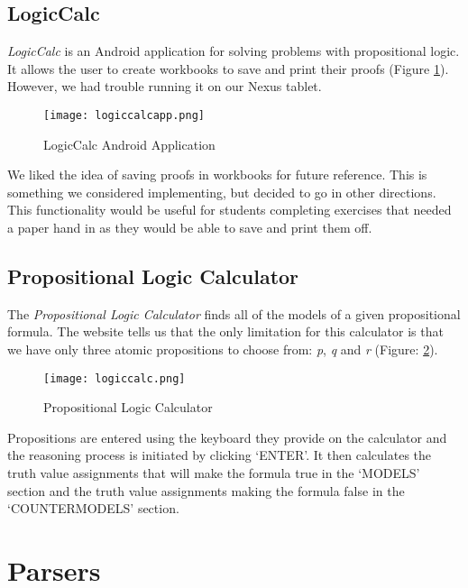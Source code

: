 \documentclass{report}
\begin{document}
\subsection{LogicCalc}

\emph{LogicCalc} is an Android application for solving problems with propositional logic. It allows the user to create workbooks to save and print their proofs (Figure \ref{logiccalcapp}). However, we had trouble running it on our Nexus tablet.

\begin{figure}[ht!]
    \centering
    \texttt{[image: logiccalcapp.png]}
    \caption{LogicCalc Android Application}
    \label{logiccalcapp}
\end{figure}

We liked the idea of saving proofs in workbooks for future reference. This is something we considered implementing, but decided to go in other directions. This functionality would be useful for students completing exercises that needed a paper hand in as they would be able to save and print them off.

\subsection{Propositional Logic Calculator}

The \emph{Propositional Logic Calculator}\cite{logiccalc} finds all of the models of a given propositional formula. The website tells us that the only limitation for this calculator is that we have only three atomic propositions to choose from: \emph{p}, \emph{q} and \emph{r} (Figure: \ref{logiccalc}).

\begin{figure}[ht!]
    \centering
    \texttt{[image: logiccalc.png]}
    \caption{Propositional Logic Calculator}
    \label{logiccalc}
\end{figure}

Propositions are entered using the keyboard they provide on the calculator and the reasoning process is initiated by clicking `ENTER'. It then calculates the truth value assignments that will make the formula true in the `MODELS' section and the truth value assignments making the formula false in the `COUNTERMODELS' section.

\FloatBarrier
\section{Parsers}
\end{document}
